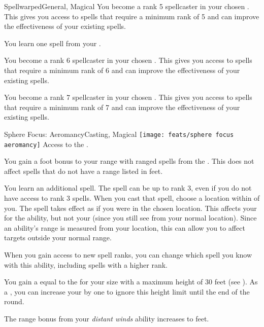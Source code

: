 \begin{magicalfeat}{Spellwarped}{General, Magical}
         You become a rank 5 spellcaster in your chosen .
        This gives you access to spells that require a minimum rank of 5 and can improve the effectiveness of your existing spells.

         You learn one spell from your .

         You become a rank 6 spellcaster in your chosen .
        This gives you access to spells that require a minimum rank of 6 and can improve the effectiveness of your existing spells.

         You become a rank 7 spellcaster in your chosen .
        This gives you access to spells that require a minimum rank of 7 and can improve the effectiveness of your existing spells.
    \end{magicalfeat}

    \begin{magicalfeat}{Sphere Focus: Aeromancy}{Casting, Magical}
        \texttt{[image: feats/sphere focus aeromancy]}
        \featpre Access to the  .

         You gain a  foot bonus to your range with ranged spells from the  .
        This does not affect spells that do not have a range listed in feet.

         You learn an additional spell.
        The spell can be up to rank 3, even if you do not have access to rank 3 spells.
        When you cast that spell, choose a location within \shortrange of you.
        The spell takes effect as if you were in the chosen location.
        This affects your  for the ability, but not your  (since you still see from your normal location).
        Since an ability's range is measured from your location, this can allow you to affect targets outside your normal range.

        When you gain access to new spell ranks, you can change which spell you know with this ability, including spells with a higher rank.

         You gain a  equal to the  for your size with a maximum height of 30 feet (see ).
        As a , you can increase your  by one to ignore this height limit until the end of the round.

         The range bonus from your \textit{distant winds} ability increases to  feet.
    \end{magicalfeat}

